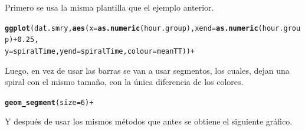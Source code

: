 \documentclass{article}\usepackage[]{graphicx}\usepackage[]{color}
\makeatletter
\newcommand{\hlkwd}[1]{\textcolor[rgb]{0.737,0.353,0.396}{\textbf{#1}}}%
\newenvironment{kframe}{%
 \def\at@end@of@kframe{}%
 \ifinner\ifhmode%
  \def\at@end@of@kframe{\end{minipage}}%
  \begin{minipage}{\columnwidth}%
 \fi\fi%
 \def\FrameCommand##1{\hskip\@totalleftmargin \hskip-\fboxsep
 \colorbox{shadecolor}{##1}\hskip-\fboxsep
     \hskip-\linewidth \hskip-\@totalleftmargin \hskip\columnwidth}%
 \MakeFramed {\advance\hsize-\width
   \@totalleftmargin\z@ \linewidth\hsize
   \@setminipage}}%
 {\par\unskip\endMakeFramed%
 \at@end@of@kframe}
\newenvironment{knitrout}{}{} %
\makeatother
\begin{document}
Primero se usa la misma plantilla que el ejemplo anterior.
\begin{knitrout}
\color{fgcolor}\begin{kframe}
\begin{alltt}
\hlkwd{ggplot}(dat.smry, \hlkwd{aes}(x=\hlkwd{as.numeric}(hour.group), xend=\hlkwd{as.numeric}(hour.group) + 0.25, 
                     y=spiralTime, yend=spiralTime, colour=meanTT)) +
\end{alltt}
\end{kframe}
\end{knitrout}
Luego, en vez de usar las barras se van a usar segmentos, los cuales, dejan una spiral con el mismo tama\~no, con la \'unica diferencia de los colores.
\begin{knitrout}
\color{fgcolor}\begin{kframe}
\begin{alltt}
  \hlkwd{geom_segment}(size=6) +
\end{alltt}
\end{kframe}
\end{knitrout}
Y despu\'es de usar los mismos m\'etodos que antes se obtiene el siguiente gr\'afico.
\end{document}
